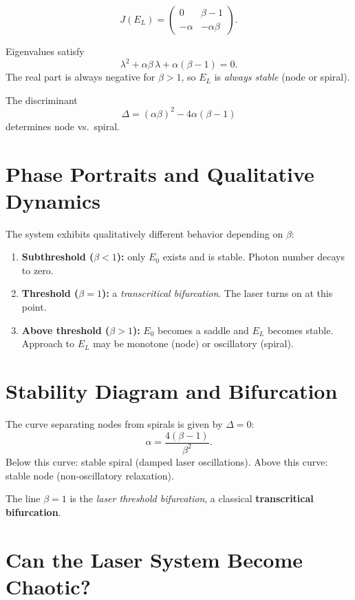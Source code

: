 \documentclass[11pt]{amsart}
\begin{document}
\[
J(E_L)=
\begin{pmatrix}
0 & \beta-1\\
-\alpha & -\alpha\beta
\end{pmatrix}.
\]

Eigenvalues satisfy
\[
\lambda^2 + \alpha\beta\,\lambda + \alpha(\beta-1)=0.
\]
The real part is always negative for $\beta>1$, so $E_L$ is
\emph{always stable} (node or spiral).

The discriminant
\[
\Delta=(\alpha\beta)^2-4\alpha(\beta-1)
\]
determines node vs.\ spiral.

\vspace{1em}
\section{Phase Portraits and Qualitative Dynamics}

The system exhibits qualitatively different behavior depending on $\beta$:

\begin{enumerate}
\item \textbf{Subthreshold ($\beta<1$):} only $E_0$ exists and is stable.
Photon number decays to zero.

\item \textbf{Threshold ($\beta=1$):} a \emph{transcritical bifurcation}.  
The laser turns on at this point.

\item \textbf{Above threshold ($\beta>1$):} $E_0$ becomes a saddle and $E_L$ becomes stable.  
Approach to $E_L$ may be monotone (node) or oscillatory (spiral).
\end{enumerate}

\vspace{1em}
\section{Stability Diagram and Bifurcation}

The curve separating nodes from spirals is given by $\Delta=0$:
\[
\alpha = \frac{4(\beta-1)}{\beta^2}.
\]
Below this curve: stable spiral (damped laser oscillations).  
Above this curve: stable node (non-oscillatory relaxation).

The line $\beta=1$ is the \emph{laser threshold bifurcation}, a classical
\textbf{transcritical bifurcation}.

\vspace{1em}
\section{Can the Laser System Become Chaotic?}
\end{document}
